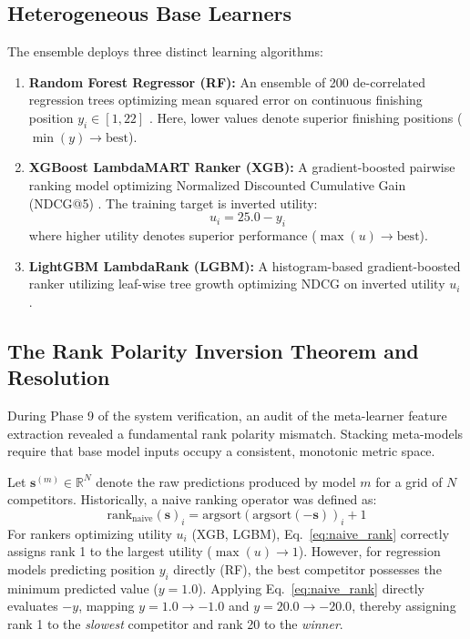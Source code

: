 \subsection{Heterogeneous Base Learners}
The ensemble deploys three distinct learning algorithms:
\begin{enumerate}
    \item \textbf{Random Forest Regressor (RF):} An ensemble of 200 de-correlated regression trees optimizing mean squared error on continuous finishing position $y_i \in [1, 22]$ \cite{breiman2001random}. Here, lower values denote superior finishing positions ($\min(y) \to \text{best}$).
    \item \textbf{XGBoost LambdaMART Ranker (XGB):} A gradient-boosted pairwise ranking model optimizing Normalized Discounted Cumulative Gain (NDCG@5) \cite{chen2016xgboost}. The training target is inverted utility:
    \begin{equation}
    u_i = 25.0 - y_i
    \end{equation}
    where higher utility denotes superior performance ($\max(u) \to \text{best}$).
    \item \textbf{LightGBM LambdaRank (LGBM):} A histogram-based gradient-boosted ranker utilizing leaf-wise tree growth optimizing NDCG on inverted utility $u_i$ \cite{ke2017lightgbm}.
\end{enumerate}

\subsection{The Rank Polarity Inversion Theorem and Resolution}
During Phase 9 of the system verification, an audit of the meta-learner feature extraction revealed a fundamental rank polarity mismatch. Stacking meta-models require that base model inputs occupy a consistent, monotonic metric space. 

Let $\mathbf{s}^{(m)} \in \mathbb{R}^N$ denote the raw predictions produced by model $m$ for a grid of $N$ competitors. Historically, a naive ranking operator was defined as:
\begin{equation}
\text{rank}_{\text{naive}}(\mathbf{s})_i = \text{argsort}\left( \text{argsort}(-\mathbf{s}) \right)_i + 1
\label{eq:naive_rank}
\end{equation}
For rankers optimizing utility $u_i$ (XGB, LGBM), Eq.~\eqref{eq:naive_rank} correctly assigns rank 1 to the largest utility ($\max(u) \to 1$). However, for regression models predicting position $y_i$ directly (RF), the best competitor possesses the minimum predicted value ($y = 1.0$). Applying Eq.~\eqref{eq:naive_rank} directly evaluates $-y$, mapping $y = 1.0 \to -1.0$ and $y = 20.0 \to -20.0$, thereby assigning rank 1 to the \textit{slowest} competitor and rank 20 to the \textit{winner}.

